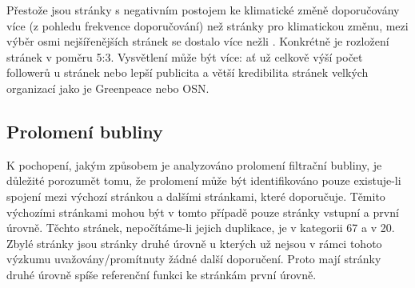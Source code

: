     Přestože jsou stránky s negativním postojem ke klimatické změně doporučová\-ny více (z pohledu frekvence doporučování) než stránky pro klimatickou změnu, mezi výběr osmi nejšířenějších stránek se dostalo více  nežli . Konkrétně je rozložení stránek v poměru 5:3. Vysvětlení může být více: ať už celkově výší počet followerů u stránek  nebo lepší publicita a větší kredibilita stránek velkých organizací jako je Greenpeace nebo OSN.

    \setlength{\arrayrulewidth}{0.5mm}
    \setlength{\tabcolsep}{25pt}
    \renewcommand{\arraystretch}{2} 
    
    \begin{table} [h!] 
    \centering
    \caption{Nejčastěji šířené stránky}
    \label{table:nejcasteji-sirene-stranky}
    \end{table}

\subsection{Prolomení bubliny}
\label{sec:prolomeni-bubliny}
    K pochopení, jakým způsobem je analyzováno prolomení filtrační bubliny, je důležité porozumět tomu, že prolomení může být identifikováno pouze existuje-li spojení mezi výchozí stránkou a dalšími stránkami, které doporučuje. Těmito výchozími stránkami mohou být v tomto případě pouze stránky vstupní a první úrovně. Těchto stránek, nepočítáme-li jejich duplikace, je v kategorii  67 a v  20. Zbylé stránky jsou stránky druhé úrovně u kterých už nejsou v rámci tohoto výzkumu uvažovány/promítnuty žádné další doporučení. Proto mají stránky druhé úrovně spíše referenční funkci ke stránkám první úrovně. 
    
